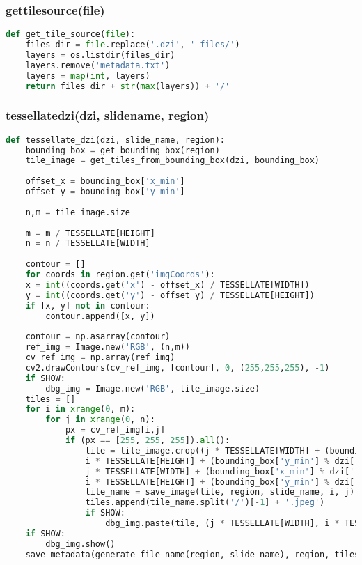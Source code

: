 \subsubsection{get{\textunderscore}tile{\textunderscore}source(file)}

\begin{lstlisting}[frame=single,language=python]
def get_tile_source(file):
	files_dir = file.replace('.dzi', '_files/')
	layers = os.listdir(files_dir)
	layers.remove('metadata.txt')
	layers = map(int, layers)
	return files_dir + str(max(layers)) + '/'
\end{lstlisting}


\subsubsection{tessellate{\textunderscore}dzi(dzi, slide{\textunderscore}name, region)}

\begin{lstlisting}[frame=single,language=python]
def tessellate_dzi(dzi, slide_name, region):
	bounding_box = get_bounding_box(region)
	tile_image = get_tiles_from_bounding_box(dzi, bounding_box)
	
	offset_x = bounding_box['x_min']
	offset_y = bounding_box['y_min']
	
	n,m = tile_image.size
	
	m = m / TESSELLATE[HEIGHT]
	n = n / TESSELLATE[WIDTH]
	
	contour = []
	for coords in region.get('imgCoords'):
	x = int((coords.get('x') - offset_x) / TESSELLATE[WIDTH])
	y = int((coords.get('y') - offset_y) / TESSELLATE[HEIGHT])
	if [x, y] not in contour:
		contour.append([x, y])
	
	contour = np.asarray(contour)
	ref_img = Image.new('RGB', (n,m))
	cv_ref_img = np.array(ref_img)
	cv2.drawContours(cv_ref_img, [contour], 0, (255,255,255), -1)
	if SHOW:
		dbg_img = Image.new('RGB', tile_image.size)
	tiles = []
	for i in xrange(0, m):
		for j in xrange(0, n):
			px = cv_ref_img[i,j]
			if (px == [255, 255, 255]).all():
				tile = tile_image.crop((j * TESSELLATE[WIDTH] + (bounding_box['x_min'] % dzi['tile_size']),
				i * TESSELLATE[HEIGHT] + (bounding_box['y_min'] % dzi['tile_size']),
				j * TESSELLATE[WIDTH] + (bounding_box['x_min'] % dzi['tile_size']) + TESSELLATE[WIDTH],
				i * TESSELLATE[HEIGHT] + (bounding_box['y_min'] % dzi['tile_size']) + TESSELLATE[HEIGHT]))
				tile_name = save_image(tile, region, slide_name, i, j)
				tiles.append(tile_name.split('/')[-1] + '.jpeg')
				if SHOW:
					dbg_img.paste(tile, (j * TESSELLATE[WIDTH], i * TESSELLATE[HEIGHT]))
	if SHOW:
		dbg_img.show()
	save_metadata(generate_file_name(region, slide_name), region, tiles)
\end{lstlisting}


